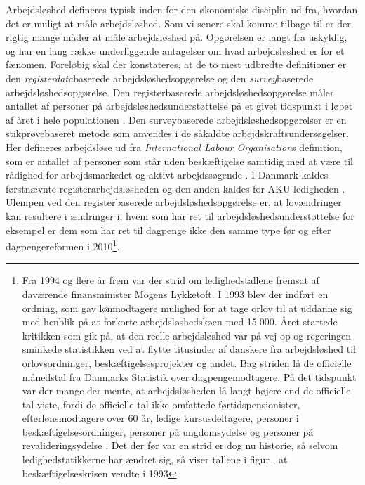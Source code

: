 Arbejdsløshed defineres typisk inden for den økonomiske disciplin ud fra, hvordan det er muligt at måle arbejdsløshed. Som vi senere skal komme tilbage til er der rigtig mange måder at måle arbejdsløshed på. Opgørelsen er langt fra uskyldig, og har en lang række underliggende antagelser om hvad arbejdsløshed er for et fænomen. Foreløbig skal der konstateres, at de to mest udbredte definitioner er den \textit{registerdata}baserede arbejdsløshedsopgørelse og den \textit{survey}baserede arbejdsløshedsopgørelse. Den registerbaserede arbejdsløshedsopgørelse måler antallet af personer på arbejdsløshedsunderstøttelse på et givet tidspunkt i løbet af året i hele populationen \parencite[594]{Mankiw2011}. Den surveybaserede arbejdsløshedsopgørelser er en stikprøvebaseret metode som anvendes i de såkaldte arbejdskraftsundersøgelser. Her defineres arbejdsløse ud fra \textit{International Labour Organisation}s definition, som er antallet af personer som står uden beskæftigelse samtidig med at være til rådighed for arbejdsmarkedet og aktivt arbejdssøgende \parencite{ILO1982}. I Danmark kaldes førstnævnte registerarbejdsløsheden og den anden kaldes for AKU-ledigheden \parencite{DST2014a}. Ulempen ved den registerbaserede arbejdsløshedsopgørelse er, at lovændringer kan resultere i ændringer i, hvem som har ret til arbejdsløshedsunderstøttelse for eksempel er dem som har ret til dagpenge ikke den samme type før og efter dagpengereformen i 2010\footnote{Fra 1994 og flere år frem var der strid om ledighedstallene fremsat af daværende finansminister Mogens Lykketoft. I 1993 blev der indført en ordning, som gav lønmodtagere mulighed for at tage orlov til at uddanne sig med henblik på at forkorte arbejdsløshedskøen med 15.000. Året startede kritikken som gik på, at den reelle arbejdsløshed var på vej op og regeringen sminkede statistikken ved at flytte titusinder af danskere fra arbejdsløshed til orlovsordninger, beskæftigelsesprojekter og andet. Bag striden lå de officielle månedstal fra Danmarks Statistik over dagpengemodtagere. På det tidspunkt var der mange der mente, at arbejdsløsheden lå langt højere end de officielle tal viste, fordi de officielle tal ikke omfattede førtidspensionister, efterlønsmodtagere over 60 år, ledige kursusdeltagere, personer i beskæftigelsesordninger, personer på ungdomsydelse og personer på revalideringsydelse \parencite{henvisning mangler}. Det der før var en strid er dog nu historie, så selvom ledighedstatikkerne har ændret sig, så viser tallene i figur \label{fig_udvikl.arbejdsloeshed}, at beskæftigelseskrisen vendte i 1993}. %

